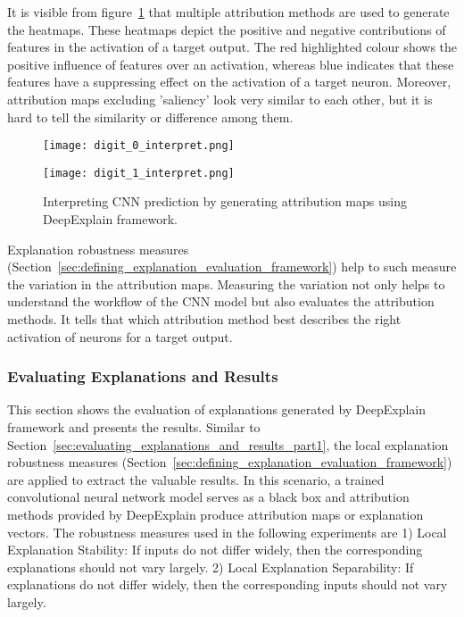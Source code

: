\documentclass[english]{tktltiki2}
\theoremstyle{definition}
\theoremstyle{remark}
\begin{document}
It is visible from figure~\ref{fig:interpreting_CNN_using_DeepExplain} that multiple attribution methods are used to generate the heatmaps. These heatmaps depict the positive and negative contributions of features in the activation of a target output. The red highlighted colour shows the positive influence of features over an activation, whereas blue indicates that these features have a suppressing effect on the activation of a target neuron. Moreover, attribution maps excluding 'saliency' look very similar to each other, but it is hard to tell the similarity or difference among them. 

\begin{figure}[H]
	\vspace*{0mm}
	\centering
	\texttt{[image: digit\_0\_interpret.png]}
\end{figure}

\begin{figure}[H]
	\vspace*{-10 mm}
	\centering
	\texttt{[image: digit\_1\_interpret.png]}
	\caption{Interpreting CNN prediction by generating attribution maps using DeepExplain framework.}%
	\label{fig:interpreting_CNN_using_DeepExplain}%
\end{figure}
 
Explanation robustness measures (Section~\ref{sec:defining_explanation_evaluation_framework}) help to such measure the variation in the attribution maps. Measuring the variation not only helps to understand the workflow of the CNN model but also evaluates the attribution methods. It tells that which attribution method best describes the right activation of neurons for a target output.

\subsubsection{Evaluating Explanations and Results}\label{sec:CNN_evaluating_explnations_and_resuls}
This section shows the evaluation of explanations generated by DeepExplain framework and presents the results. Similar to Section~\ref{sec:evaluating_explanations_and_results_part1}, the local explanation robustness measures (Section~\ref{sec:defining_explanation_evaluation_framework}) are applied to extract the valuable results. In this scenario, a trained convolutional neural network model serves as a black box and attribution methods provided by DeepExplain produce attribution maps or explanation vectors. The robustness measures used in the following experiments are 1) Local Explanation Stability: If inputs do not differ widely, then the corresponding explanations should not vary largely. 2) Local Explanation Separability: If explanations do not differ widely, then the corresponding inputs should not vary largely.
\end{document}
